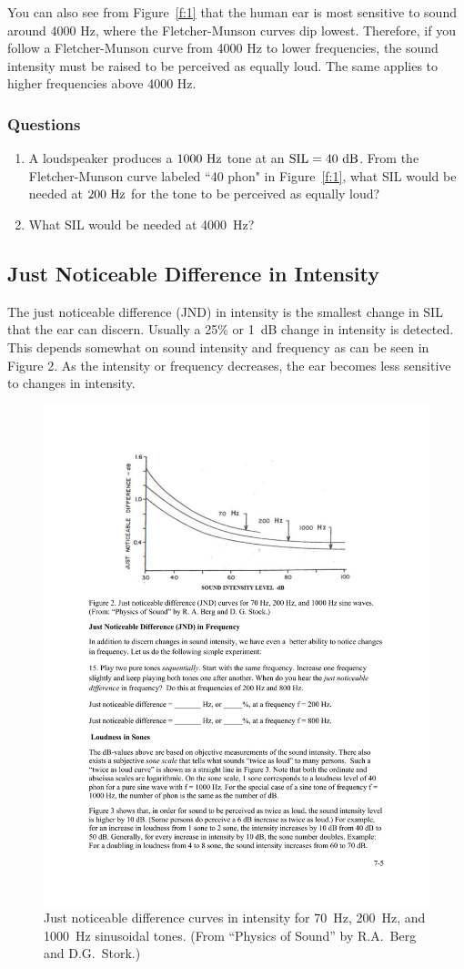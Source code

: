 \documentclass[11pt]{NSF}
\def\ben{\begin{enumerate}}
\def\een{\end{enumerate}}
\begin{document}
You can also see from Figure~\ref{f:1} that the human ear is most sensitive to
sound around 4000 Hz, where the Fletcher-Munson curves dip lowest.
Therefore, if you follow a Fletcher-Munson curve from 4000 Hz to lower
frequencies, the sound intensity must be raised to be perceived as
equally loud. The same applies to higher frequencies above 4000 Hz.

\subsubsection*{Questions}
\ben
\item
A loudspeaker produces a $1000~{\rm Hz}$ tone at an ${\rm
SIL}=40~{\rm dB}$.
From the Fletcher-Munson curve labeled ``40 phon" in Figure~\ref{f:1},
what SIL would be needed at $200~{\rm Hz}$ for the tone to be 
perceived as equally loud?

\item 
What SIL would be needed at 4000~Hz?

\een

\subsection{Just Noticeable Difference in Intensity}

The just noticeable difference (JND) in intensity is the smallest
change in SIL that the ear can discern. Usually a 25\% or 1~dB change in
intensity is detected. This depends somewhat on sound intensity and
frequency as can be seen in Figure 2. As the intensity or frequency
decreases, the ear becomes less sensitive to changes in intensity.
%
\begin{figure}[hbtp]
\begin{center}
\includegraphics[width=.7\textwidth]{fig7_2}
\caption{Just noticeable difference curves in intensity 
for 70~Hz, 200~Hz, and 1000~Hz sinusoidal tones. 
(From ``Physics of Sound” by R.A.~Berg and D.G.~Stork.)}
\label{f:2}
\end{center}
\end{figure}
\end{document}
